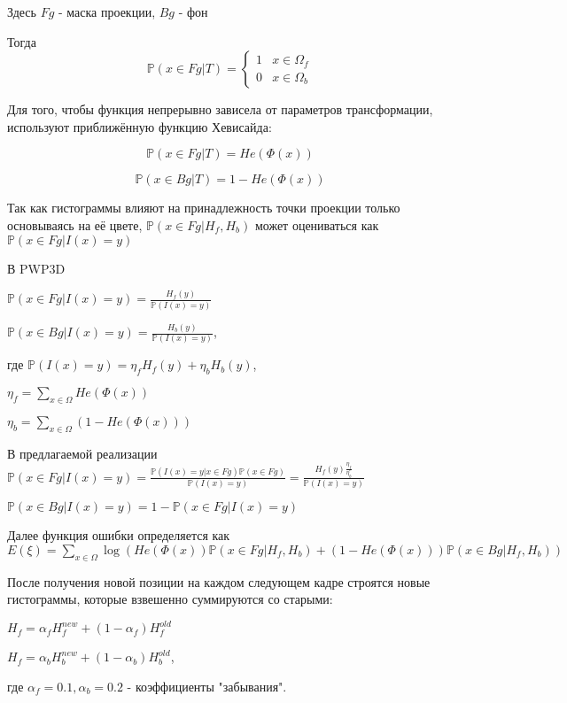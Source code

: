 
Здесь $Fg$ - маска проекции, $Bg$ - фон

Тогда
\begin{equation*}
\mathbb{P}(x \in Fg | T) = 
 \begin{cases}
   1 &x \in \Omega_f\\
   0 &x \in \Omega_b
 \end{cases}
\end{equation*}

Для того, чтобы функция непрерывно зависела от параметров трансформации, используют приближённую функцию Хевисайда:

$$\mathbb{P}(x \in Fg | T) = He(\Phi(x))$$ 

$$\mathbb{P}(x \in Bg | T) = 1 - He(\Phi(x))$$

Так как гистограммы влияют на принадлежность точки проекции только основываясь на её цвете, $\mathbb{P}(x \in Fg | H_f, H_b)$ может оцениваться как $\mathbb{P}(x \in Fg | I(x) = y)$

В PWP3D 

$\mathbb{P}(x \in Fg | I(x) = y) = \frac{H_f(y)}{\mathbb{P}(I(x) = y)}$

$\mathbb{P}(x \in Bg | I(x) = y) = \frac{H_b(y)}{\mathbb{P}(I(x) = y)}$, 

где $\mathbb{P}(I(x) = y) = \eta_f H_f(y) + \eta_b H_b(y)$,

$\eta_f = \sum\limits_{x \in \Omega}He(\Phi(x))$

$\eta_b = \sum\limits_{x \in \Omega}(1 - He(\Phi(x)))$

В предлагаемой реализации $\mathbb{P}(x \in Fg | I(x) = y) = \frac{\mathbb{P}(I(x) = y | x \in Fg) \mathbb{P}(x \in Fg)}{\mathbb{P}(I(x) = y)} = \frac{H_f(y)\frac{\eta_f}{\eta_b}}{\mathbb{P}(I(x) = y)}$

$\mathbb{P}(x \in Bg | I(x) = y) = 1 - \mathbb{P}(x \in Fg | I(x) = y)$

Далее функция ошибки определяется как $E(\xi) = \sum\limits_{x \in \Omega}\log(He(\Phi(x))\mathbb{P}(x \in Fg | H_f, H_b) + (1 - He(\Phi(x)))\mathbb{P}(x \in Bg|H_f, H_b))$

После получения новой позиции на каждом следующем кадре строятся новые гистограммы, которые взвешенно суммируются со старыми: 

$H_{f} = \alpha_f H_{f}^{new} + (1 - \alpha_f) H_f^{old}$

$H_{f} = \alpha_b H_{b}^{new} + (1 - \alpha_b) H_b^{old}$, 

где $\alpha_f = 0.1, \alpha_b = 0.2$ - коэффициенты "забывания".

